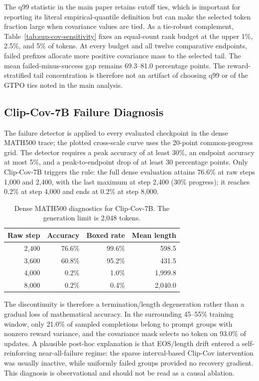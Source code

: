 \documentclass[letterpaper]{article}
\begin{document}
The q99 statistic in the main paper retains cutoff ties, which is important
for reporting its literal empirical-quantile definition but can make the
selected token fraction large when covariance values are tied.  As a
tie-robust complement, Table~\ref{tab:sup-cov-sensitivity} fixes an
equal-count rank budget at the upper 1\%, 2.5\%, and 5\% of tokens.  At every
budget and all twelve comparative endpoints, failed prefixes allocate more
positive covariance mass to the selected tail.  The mean failed-minus-success
gap remains 69.3--81.0 percentage points.  The reward-stratified tail
concentration is therefore not an artifact of choosing q99 or of the GTPO
ties noted in the main analysis.

\subsection{Clip-Cov-7B Failure Diagnosis}

The failure detector is applied to every evaluated checkpoint in the dense
MATH500 trace; the plotted cross-scale curve uses the 20-point common-progress
grid.  The detector requires a peak accuracy of at least 30\%, an endpoint
accuracy at most 5\%, and a peak-to-endpoint drop of at least 30 percentage
points.  Only
Clip-Cov-7B triggers the rule: the full dense evaluation attains 76.6\% at
raw steps 1,000 and 2,400, with the last maximum at step 2,400 (30\%
progress); it reaches 0.2\% at step 4,000 and ends at 0.2\% at step 8,000.

\begin{table}[t]
\centering
\small
\setlength{\tabcolsep}{3.8pt}
\begin{tabular*}{\columnwidth}{@{\extracolsep{\fill}}rrrr}
\toprule
Raw step & Accuracy & Boxed rate & Mean length\\
\midrule
2,400 & 76.6\% & 99.6\% & 598.5\\
3,600 & 60.8\% & 95.2\% & 431.5\\
4,000 & 0.2\% & 1.0\% & 1,999.8\\
8,000 & 0.2\% & 0.4\% & 2,040.0\\
\bottomrule
\end{tabular*}
\caption{Dense MATH500 diagnostics for Clip-Cov-7B.  The generation limit is
2,048 tokens.}
\label{tab:sup-clip-failure}
\end{table}

The discontinuity is therefore a termination/length degeneration rather than
a gradual loss of mathematical accuracy.  In the surrounding 45--55\%
training window, only 21.0\% of sampled completions belong to prompt groups
with nonzero reward variance, and the covariance mask selects no token on
93.0\% of updates.  A plausible post-hoc explanation is that EOS/length drift
entered a self-reinforcing near-all-failure regime: the sparse interval-based
Clip-Cov intervention was usually inactive, while uniformly failed groups
provided no recovery gradient.  This diagnosis is observational and should
not be read as a causal ablation.
\end{document}
